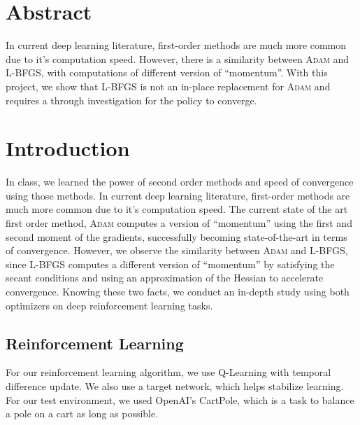 \documentclass[11pt]{article}
\title{\projecttitle{}}
\begin{document}
\thispagestyle{empty}
\maketitle

\section{Abstract}
In current deep learning literature, first-order methods are much more common due to it's computation speed.
However, there is a similarity between \textsc{Adam} and \textsc{L-BFGS}, with computations of different version of ``momentum''.
With this project, we show that \textsc{L-BFGS} is not an in-place replacement for \textsc{Adam} and requires a through investigation for the policy to converge.

\section{Introduction}
In class, we learned the power of second order methods and speed of convergence using those methods.
In current deep learning literature, first-order methods are much more common due to it's computation speed.
The current state of the art first order method, \textsc{Adam} computes a version of ``momentum'' using the first and second moment of the gradients, successfully becoming state-of-the-art in terms of convergence.
However, we observe the similarity between \textsc{Adam} and \textsc{L-BFGS}, since \textsc{L-BFGS} computes a different version of ``momentum'' by satisfying the secant conditions and using an approximation of the Hessian to accelerate convergence.
Knowing these two facts, we conduct an in-depth study using both optimizers on deep reinforcement learning tasks.
\subsection{Reinforcement Learning}
For our reinforcement learning algorithm, we use Q-Learning with temporal difference update.
We also use a target network, which helps stabilize learning.
For our test environment, we used OpenAI's CartPole, which is a task to balance a pole on a cart as long as possible.

\end{document}
